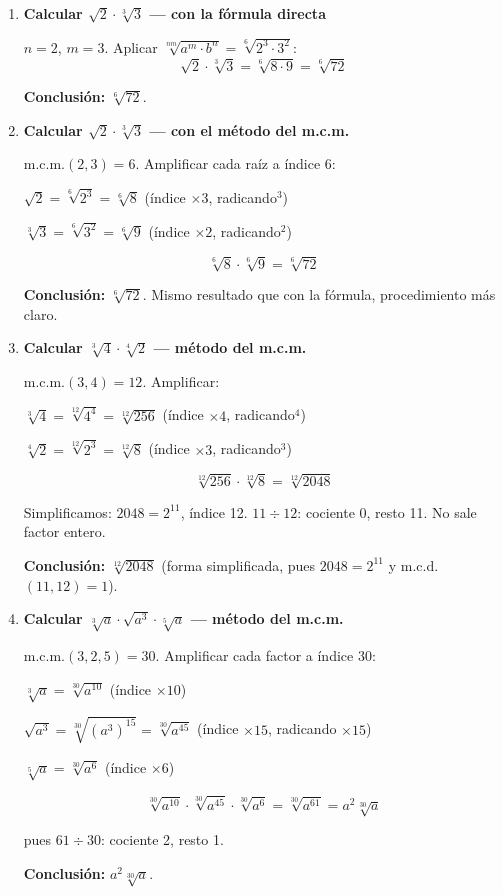 \documentclass[11pt, letterpaper]{article}
\begin{document}
\begin{tcolorbox}[examplebox, title={Ejemplos — multiplicación con distinto índice}]
\begin{enumerate}[label=\textbf{Ej. \arabic*.}, leftmargin=*, itemsep=14pt]

\item \textbf{Calcular $\sqrt{2}\cdot\sqrt[3]{3}$ — con la fórmula directa}

$n=2$, $m=3$. Aplicar $\sqrt[nm]{a^m\cdot b^n}=\sqrt[6]{2^3\cdot 3^2}$:
$$\sqrt{2}\cdot\sqrt[3]{3}=\sqrt[6]{8\cdot 9}=\sqrt[6]{72}$$

\textbf{Conclusión:} $\sqrt[6]{72}$.

\item \textbf{Calcular $\sqrt{2}\cdot\sqrt[3]{3}$ — con el método del m.c.m.}

m.c.m.$(2,3)=6$. Amplificar cada raíz a índice 6:

$\sqrt{2}=\sqrt[6]{2^3}=\sqrt[6]{8}$ \quad (índice $\times 3$, radicando$^3$)

$\sqrt[3]{3}=\sqrt[6]{3^2}=\sqrt[6]{9}$ \quad (índice $\times 2$, radicando$^2$)

$$\sqrt[6]{8}\cdot\sqrt[6]{9}=\sqrt[6]{72}$$

\textbf{Conclusión:} $\sqrt[6]{72}$. Mismo resultado que con la fórmula, procedimiento más claro.

\item \textbf{Calcular $\sqrt[3]{4}\cdot\sqrt[4]{2}$ — método del m.c.m.}

m.c.m.$(3,4)=12$. Amplificar:

$\sqrt[3]{4}=\sqrt[12]{4^4}=\sqrt[12]{256}$ \quad (índice $\times 4$, radicando$^4$)

$\sqrt[4]{2}=\sqrt[12]{2^3}=\sqrt[12]{8}$ \quad (índice $\times 3$, radicando$^3$)

$$\sqrt[12]{256}\cdot\sqrt[12]{8}=\sqrt[12]{2048}$$

Simplificamos: $2048=2^{11}$, índice 12. $11\div 12$: cociente 0, resto 11. No sale factor entero.

\textbf{Conclusión:} $\sqrt[12]{2048}$ (forma simplificada, pues $2048=2^{11}$ y m.c.d.$(11,12)=1$).

\item \textbf{Calcular $\sqrt[3]{a}\cdot\sqrt{a^3}\cdot\sqrt[5]{a}$ — método del m.c.m.}

m.c.m.$(3,2,5)=30$. Amplificar cada factor a índice 30:

$\sqrt[3]{a}=\sqrt[30]{a^{10}}$ \quad (índice $\times 10$)

$\sqrt{a^3}=\sqrt[30]{(a^3)^{15}}=\sqrt[30]{a^{45}}$ \quad (índice $\times 15$, radicando $\times 15$)

$\sqrt[5]{a}=\sqrt[30]{a^{6}}$ \quad (índice $\times 6$)

$$\sqrt[30]{a^{10}}\cdot\sqrt[30]{a^{45}}\cdot\sqrt[30]{a^{6}}=\sqrt[30]{a^{61}}=a^2\sqrt[30]{a}$$

pues $61\div 30$: cociente 2, resto 1.

\textbf{Conclusión:} $a^2\sqrt[30]{a}$.

\end{enumerate}
\end{tcolorbox}
\end{document}
